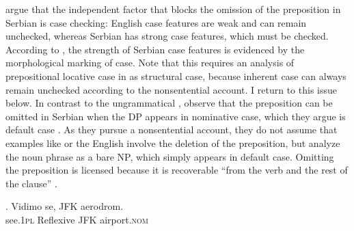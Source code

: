 \citet{barton.progovac2005} argue that the independent factor that blocks the omission of the preposition in Serbian is case checking: English case features are weak and can remain unchecked, whereas Serbian has strong case features, which must be checked. According to \citeauthor{barton.progovac2005}, the strength of Serbian case features is evidenced by the morphological marking of case. Note that this requires an analysis of prepositional locative case in \Last[b] as structural case, because inherent case can always remain unchecked according to the nonsentential account. I return to this issue below. In contrast to the ungrammatical \Last[b], \citeauthor{barton.progovac2005} observe that the preposition can be omitted in Serbian when the DP appears in nominative case, which they argue is default case \Next. As they pursue a nonsentential account, they do not assume that examples like \Next or the English \Last[a] involve the deletion of the preposition, but analyze the noun phrase as a bare NP, which simply appears in default case. Omitting the preposition is licensed because it is recoverable ``from the verb and the rest of the clause'' \citep[89]{barton.progovac2005}.

\exg. Vidimo se, JFK aerodrom.  \\
see.\textsc{1pl} Reflexive  JFK airport.\textsc{nom}\\
 

